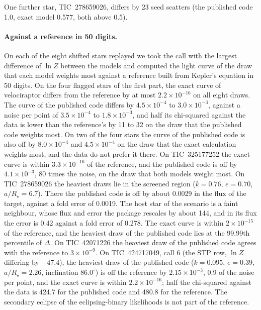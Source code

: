 \documentclass[11pt]{article}
\begin{document}
One further star, TIC~278659026, differs by 23 seed scatters (the published code 1.0, exact model 0.577, both above 0.5).

\paragraph{Against a reference in 50 digits.} On each of the eight shifted stars replayed we took the call with the largest difference of $\ln Z$ between the models and computed the light curve of the draw that each model weights most against a reference built from Kepler's equation in 50 digits. On the four flagged stars of the first part, the exact curve of velociraptor differs from the reference by at most $2.2\times10^{-16}$ on all eight draws. The curve of the published code differs by $4.5\times10^{-4}$ to $3.0\times10^{-3}$, against a noise per point of $3.5\times10^{-4}$ to $1.8\times10^{-3}$, and half its chi-squared against the data is lower than the reference's by 11 to 32 on the draw that the published code weights most. On two of the four stars the curve of the published code is also off by $8.0\times10^{-4}$ and $4.5\times10^{-4}$ on the draw that the exact calculation weights most, and the data do not prefer it there. On TIC~325177252 the exact curve is within $3.3\times10^{-16}$ of the reference, and the published code is off by $4.1\times10^{-3}$, 80 times the noise, on the draw that both models weight most. On TIC~278659026 the heaviest draws lie in the screened region ($k=0.76$, $e=0.70$, $a/R_\star=6.7$). There the published code is off by about 0.0029 in the flux of the target, against a fold error of 0.0019. The host star of the scenario is a faint neighbour, whose flux and error the package rescales by about 144, and in its flux the error is 0.42 against a fold error of 0.278. The exact curve is within $2\times10^{-15}$ of the reference, and the heaviest draw of the published code lies at the 99.99th percentile of $\Delta$. On TIC~42071226 the heaviest draw of the published code agrees with the reference to $3\times10^{-9}$. On TIC~424717049, call 6 (the STP row, $\ln Z$ differing by $+47.4$), the heaviest draw of the published code ($k=0.095$, $e=0.39$, $a/R_\star=2.26$, inclination $86.0^{\circ}$) is off the reference by $2.15\times10^{-3}$, 0.9 of the noise per point, and the exact curve is within $2.2\times10^{-16}$; half the chi-squared against the data is 424.7 for the published code and 480.8 for the reference. The secondary eclipse of the eclipsing-binary likelihoods is not part of the reference.
\end{document}
